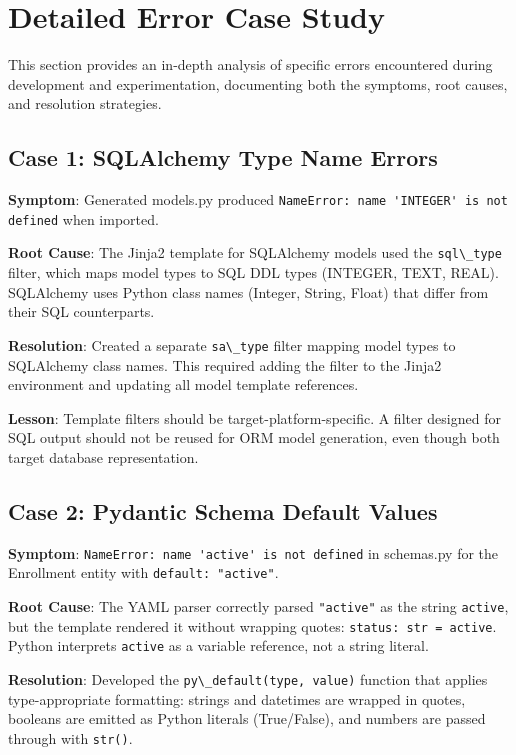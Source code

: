 \documentclass[11pt,a4paper]{article}
\begin{document}
{\newpage
\section{Detailed Error Case Study}
\label{sec:error-case-study}

This section provides an in-depth analysis of specific errors encountered during development and experimentation, documenting both the symptoms, root causes, and resolution strategies.

\subsection{Case 1: SQLAlchemy Type Name Errors}

\textbf{Symptom}: Generated models.py produced {\lstinline|NameError: name 'INTEGER' is not defined|} when imported.

\textbf{Root Cause}: The Jinja2 template for SQLAlchemy models used the {\lstinline|sql\_type|} filter, which maps model types to SQL DDL types (INTEGER, TEXT, REAL). SQLAlchemy uses Python class names (Integer, String, Float) that differ from their SQL counterparts.

\textbf{Resolution}: Created a separate {\lstinline|sa\_type|} filter mapping model types to SQLAlchemy class names. This required adding the filter to the Jinja2 environment and updating all model template references.

\textbf{Lesson}: Template filters should be target-platform-specific. A filter designed for SQL output should not be reused for ORM model generation, even though both target database representation.

\subsection{Case 2: Pydantic Schema Default Values}

\textbf{Symptom}: {\lstinline|NameError: name 'active' is not defined|} in schemas.py for the Enrollment entity with {\lstinline|default: "active"|}.

\textbf{Root Cause}: The YAML parser correctly parsed {\lstinline|"active"|} as the string \texttt{active}, but the template rendered it without wrapping quotes: {\lstinline|status: str = active|}. Python interprets \texttt{active} as a variable reference, not a string literal.

\textbf{Resolution}: Developed the {\lstinline|py\_default(type, value)|} function that applies type-appropriate formatting: strings and datetimes are wrapped in quotes, booleans are emitted as Python literals (True/False), and numbers are passed through with {\lstinline|str()|}.

}
\end{document}
